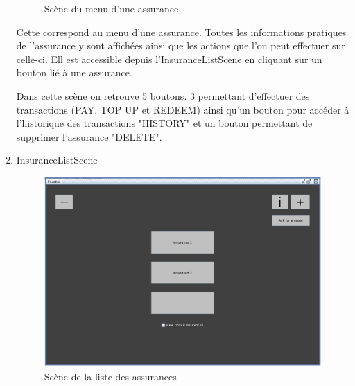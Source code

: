 \documentclass[../rapport.tex]{subfiles}
\begin{document}
\begin{enumerate}
\begin{figure}[h!]
								\caption{Scène du menu d'une assurance}
						\end{figure}

						Cette correspond au menu d'une assurance. Toutes les informations pratiques de l'assurance y sont affichées ainsi que 
						les actions que l'on peut effectuer sur celle-ci. Ell est accessible depuis l'InsuranceListScene en cliquant sur un bouton 
						lié à une assurance. 

						\medskip

						Dans cette scène on retrouve 5 boutons. 3 permettant d'effectuer des transactions (PAY, TOP UP et REDEEM) ainsi qu'un bouton
						pour accéder à l'historique des transactions "HISTORY" et un bouton permettant de supprimer l'assurance "DELETE". 
				\newpage
				\item{InsuranceListScene} 
						\begin{figure}[h!]
								\centering\includegraphics[scale=0.3]{ressources/photos_diagrammes/extensionThomas/gui1/insurancesList.jpg}
								\caption{Scène de la liste des assurances}
						\end{figure}


\end{enumerate}
\end{document}
